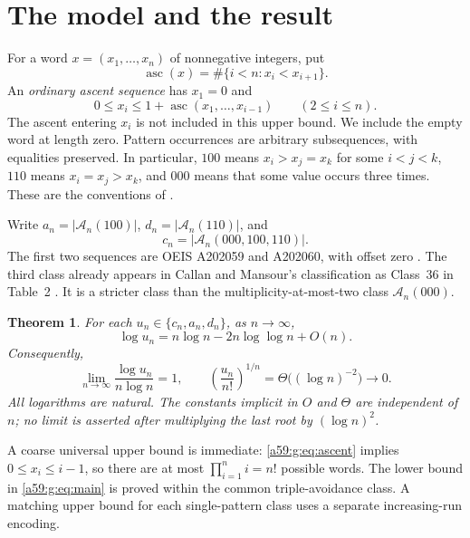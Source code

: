 \documentclass[11pt,letterpaper]{article}
\newtheorem{theorem}{Theorem}[section]\newtheorem{lemma}[theorem]{Lemma}\newtheorem{proposition}[theorem]{Proposition}\newtheorem{corollary}[theorem]{Corollary}
\theoremstyle{remark}\newtheorem{remark}[theorem]{Remark}
\newcommand{\asc}{\operatorname{asc}}\newcommand{\Av}{\operatorname{Av}}\newcommand{\N}{\mathbb N}\newcommand{\E}{\mathbb E}\newcommand{\Prob}{\mathbb P}
\newcommand{\A}{\mathcal A}
\theoremstyle{remark}\newtheorem{wremark}{Remark}\renewcommand{\thewremark}{W\arabic{wremark}}
\theoremstyle{plain}\newtheorem{wcorollary}[wremark]{Corollary}
\begin{document}
\section{The model and the result}\label{a59:g:sec:model}
For a word $x=(x_1,\ldots,x_n)$ of nonnegative integers, put
\[
 \asc(x)=\#\{i<n:x_i<x_{i+1}\}.
\]
An \emph{ordinary ascent sequence} has $x_1=0$ and
\begin{equation}\label{a59:g:eq:ascent}
 0\leq x_i\leq 1+\asc(x_1,\ldots,x_{i-1})\qquad(2\leq i\leq n).
\end{equation}
The ascent entering $x_i$ is not included in this upper bound. We include the empty word at length zero. Pattern occurrences are arbitrary subsequences, with equalities preserved. In particular, $100$ means $x_i>x_j=x_k$ for some $i<j<k$, $110$ means $x_i=x_j>x_k$, and $000$ means that some value occurs three times. These are the conventions of \cite[p.~2]{conway}.

Write $a_n=|\A_n(100)|$, $d_n=|\A_n(110)|$, and
\[
 c_n=|\A_n(000,100,110)|.
\]
The first two sequences are OEIS A202059 and A202060, with offset zero \cite{oeis100,oeis110}. The third class already appears in Callan and Mansour's classification as Class~36 in Table~2 \cite[p.~25]{callan}. It is a stricter class than the multiplicity-at-most-two class $\A_n(000)$.

\begin{theorem}\label{a59:g:thm:main}
For each $u_n\in\{c_n,a_n,d_n\}$, as $n\to\infty$,
\begin{equation}\label{a59:g:eq:main}
 \log u_n=n\log n-2n\log\log n+O(n).
\end{equation}
Consequently,
\begin{equation}\label{a59:g:eq:exponent}
 \lim_{n\to\infty}\frac{\log u_n}{n\log n}=1,\qquad
 \left(\frac{u_n}{n!}\right)^{1/n}=\Theta\bigl((\log n)^{-2}\bigr)\longrightarrow0.
\end{equation}
All logarithms are natural. The constants implicit in $O$ and $\Theta$ are independent of $n$; no limit is asserted after multiplying the last root by $(\log n)^2$.
\end{theorem}

A coarse universal upper bound is immediate: \eqref{a59:g:eq:ascent} implies $0\leq x_i\leq i-1$, so there are at most $\prod_{i=1}^n i=n!$ possible words. The lower bound in \eqref{a59:g:eq:main} is proved within the common triple-avoidance class. A matching upper bound for each single-pattern class uses a separate increasing-run encoding.
\end{document}
